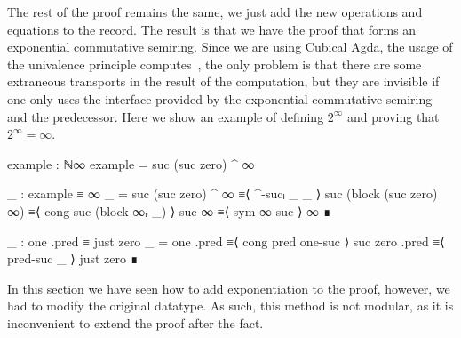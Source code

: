 The rest of the proof remains the same, we just add the new operations and
equations to the  record. The result is that we have the proof
that  forms an exponential commutative semiring. Since we are
using Cubical Agda, the usage of the univalence principle
computes~\cite{vezzosi-cubical}, the only problem is that there are some
extraneous transports in the result of the computation, but they are invisible
if one only uses the interface provided by the exponential commutative semiring
and the predecessor. Here we show an example of defining $2^\infty$ and proving
that $2^\infty = \infty$.
\begin{code}
  example : ℕ∞
  example = suc (suc zero) ^ ∞

  _ : example ≡ ∞
  _ =
    suc (suc zero) ^ ∞        ≡⟨ ^-sucₗ _ _ ⟩
    suc (block (suc zero) ∞)  ≡⟨ cong suc (block-∞ᵣ _) ⟩
    suc ∞                     ≡⟨ sym ∞-suc ⟩
    ∞                         ∎
\end{code}
\begin{code}[hide]
  _ : one .pred ≡ just zero
  _ =
    one .pred      ≡⟨ cong pred one-suc ⟩
    suc zero .pred ≡⟨ pred-suc _ ⟩
    just zero      ∎
\end{code}

In this section we have seen how to add exponentiation to the proof, however, we
had to modify the original  datatype. As such, this method is
not modular, as it is inconvenient to extend the proof after the fact.

